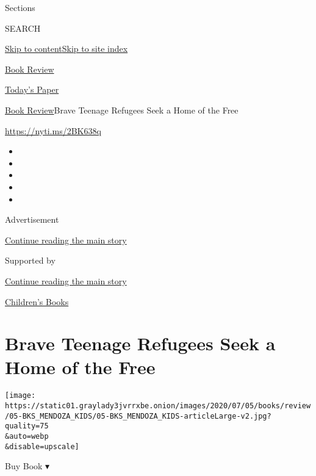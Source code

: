Sections

SEARCH

\protect\hyperlink{site-content}{Skip to
content}\protect\hyperlink{site-index}{Skip to site index}

\href{https://www.nytimes3xbfgragh.onion/section/books/review}{Book
Review}

\href{https://myaccount.nytimes3xbfgragh.onion/auth/login?response_type=cookie\&client_id=vi}{}

\href{https://www.nytimes3xbfgragh.onion/section/todayspaper}{Today's
Paper}

\href{/section/books/review}{Book Review}\textbar{}Brave Teenage
Refugees Seek a Home of the Free

\url{https://nyti.ms/2BK638q}

\begin{itemize}
\item
\item
\item
\item
\item
\end{itemize}

Advertisement

\protect\hyperlink{after-top}{Continue reading the main story}

Supported by

\protect\hyperlink{after-sponsor}{Continue reading the main story}

\href{/column/childrens-books}{Children's Books}

\hypertarget{brave-teenage-refugees-seek-a-home-of-the-free}{%
\section{Brave Teenage Refugees Seek a Home of the
Free}\label{brave-teenage-refugees-seek-a-home-of-the-free}}

\texttt{[image: https://static01.graylady3jvrrxbe.onion/images/2020/07/05/books/review/05-BKS\_MENDOZA\_KIDS/05-BKS\_MENDOZA\_KIDS-articleLarge-v2.jpg?quality=75\\\&auto=webp\\\&disable=upscale]}

Buy Book ▾


